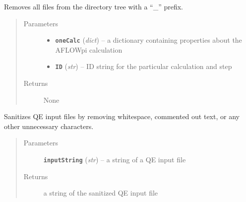 \documentclass[letterpaper,10pt,english]{sphinxmanual}
\begin{document}

\begin{fulllineitems}
\label{prep:prep.__cleanCalcs}
Removes all files from the directory tree with a ``\_'' prefix.
\begin{quote}\begin{description}
\item[{Parameters}] \leavevmode\begin{itemize}
\item {} 
\textbf{\texttt{oneCalc}} (\emph{dict}) -- a dictionary containing properties about the AFLOWpi calculation

\item {} 
\textbf{\texttt{ID}} (\emph{str}) -- ID string for the particular calculation and step

\end{itemize}

\item[{Returns}] \leavevmode
None

\end{description}\end{quote}

\end{fulllineitems}


\begin{fulllineitems}
\label{prep:prep.__cleanInputStringSCF}
Sanitizes QE input files by removing whitespace, commented out text, or any other
unnecessary characters.
\begin{quote}\begin{description}
\item[{Parameters}] \leavevmode
\textbf{\texttt{inputString}} (\emph{str}) -- a string of a QE input file

\item[{Returns}] \leavevmode
a string of the sanitized QE input file

\end{description}\end{quote}

\end{fulllineitems}

\end{document}
